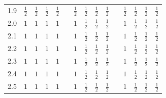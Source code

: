 \begin{tabular}{@{}l cccc c cccc c cccc@{}}
1.9 & $\tfrac{1}{2}$ & $\tfrac{1}{2}$ & $\tfrac{1}{2}$ & $\tfrac{1}{2}$ & & $\tfrac{1}{2}$ & $\tfrac{1}{2}$ & $\tfrac{1}{2}$ & $\tfrac{1}{2}$ & & $\tfrac{1}{2}$ & $\tfrac{1}{2}$ & $\tfrac{1}{2}$ & $\tfrac{1}{2}$\\
2.0 & $1$ & $1$ & $1$ & $1$ & & $1$ & $\tfrac{1}{2}$ & $\tfrac{1}{2}$ & $\tfrac{1}{2}$ & & $1$ & $\tfrac{1}{2}$ & $\tfrac{1}{2}$ & $\tfrac{1}{2}$\\
2.1 & $1$ & $1$ & $1$ & $1$ & & $1$ & $\tfrac{1}{2}$ & $\tfrac{1}{2}$ & $\tfrac{1}{2}$ & & $1$ & $\tfrac{1}{2}$ & $\tfrac{1}{2}$ & $\tfrac{1}{2}$\\
2.2 & $1$ & $1$ & $1$ & $1$ & & $1$ & $\tfrac{1}{2}$ & $\tfrac{1}{2}$ & $\tfrac{1}{2}$ & & $1$ & $\tfrac{1}{2}$ & $\tfrac{1}{2}$ & $\tfrac{1}{2}$\\
2.3 & $1$ & $1$ & $1$ & $1$ & & $1$ & $\tfrac{1}{2}$ & $\tfrac{1}{2}$ & $\tfrac{1}{2}$ & & $1$ & $\tfrac{1}{2}$ & $\tfrac{1}{2}$ & $\tfrac{1}{2}$\\
2.4 & $1$ & $1$ & $1$ & $1$ & & $1$ & $\tfrac{1}{2}$ & $\tfrac{1}{2}$ & $\tfrac{1}{2}$ & & $1$ & $\tfrac{1}{2}$ & $\tfrac{1}{2}$ & $\tfrac{1}{2}$\\
2.5 & $1$ & $1$ & $1$ & $1$ & & $1$ & $\tfrac{1}{2}$ & $\tfrac{1}{2}$ & $\tfrac{1}{2}$ & & $1$ & $\tfrac{1}{2}$ & $\tfrac{1}{2}$ & $\tfrac{1}{2}$\\
\bottomrule
\end{tabular}
